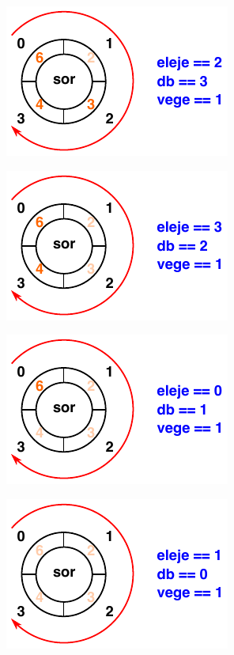 \documentclass[usenames,dvipsnames,aspectratio=169]{beamer}
\begin{document}
\begin{frame}
  \begin{center}
    \includegraphics[scale=1.5]{sor/sor08.pdf}
  \end{center}
\end{frame}

\begin{frame}
  \begin{center}
    \includegraphics[scale=1.5]{sor/sor09.pdf}
  \end{center}
\end{frame}

\begin{frame}
  \begin{center}
    \includegraphics[scale=1.5]{sor/sor10.pdf}
  \end{center}
\end{frame}

\begin{frame}
  \begin{center}
    \includegraphics[scale=1.5]{sor/sor11.pdf}
  \end{center}
\end{frame}
\end{document}
